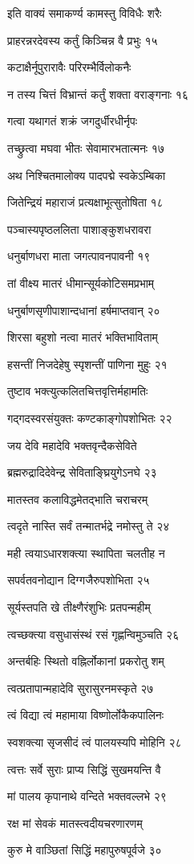 इति वाक्यं समाकर्ण्य कामस्तु विविधैः शरैः

प्राहरन्नरदेवस्य कर्तुं किञ्चिन्न वै प्रभुः १५

कटाक्षैर्नूपुरारावैः परिरम्भैर्विलोकनैः

न तस्य चित्तं विभ्रान्तं कर्तुं शक्ता वराङ्गनाः १६

गत्वा यथागतं शक्रं जगदुर्धीरधीर्नृपः

तच्छ्रुत्वा मघवा भीतः सेवामारभतात्मनः १७

अथ निश्चितमालोक्य पादपद्मे स्वकेऽम्बिका

जितेन्द्रियं महाराजं प्रत्यक्षाभूत्सुतोषिता १८

पञ्चास्यपृष्ठललिता पाशाङ्कुशधरावरा

धनुर्बाणधरा माता जगत्पावनपावनी १९

तां वीक्ष्य मातरं धीमान्सूर्यकोटिसमप्रभाम्

धनुर्बाणसृणीपाशान्दधानां हर्षमाप्तवान् २०

शिरसा बहुशो नत्वा मातरं भक्तिभाविताम्

हसन्तीं निजदेहेषु स्पृशन्तीं पाणिना मुहुः २१

तुष्टाव भक्त्युत्कलितचित्तवृत्तिर्महामतिः

गद्गदस्वरसंयुक्तः कण्टकाङ्गोपशोभितः २२

जय देवि महादेवि भक्तवृन्दैकसेविते

ब्रह्मरुद्रादिदेवेन्द्र सेविताङ्घ्रियुगेऽनघे २३

मातस्तव कलाविद्धमेतद्भाति चराचरम्

त्वदृते नास्ति सर्वं तन्मातर्भद्रे नमोस्तु ते २४

मही त्वयाऽधारशक्त्या स्थापिता चलतीह न

सपर्वतवनोद्यान दिग्गजैरुपशोभिता २५

सूर्यस्तपति खे तीक्ष्णैरंशुभिः प्रतपन्महीम्

त्वच्छक्त्या वसुधासंस्थं रसं गृह्णन्विमुञ्चति २६

अन्तर्बहिः स्थितो वह्निर्लोकानां प्रकरोतु शम्

त्वत्प्रतापान्महादेवि सुरासुरनमस्कृते २७

त्वं विद्या त्वं महामाया विष्णोर्लोकैकपालिनः

स्वशक्त्या सृजसीदं त्वं पालयस्यपि मोहिनि २८

त्वत्तः सर्वे सुराः प्राप्य सिद्धिं सुखमयन्ति वै

मां पालय कृपानाथे वन्दिते भक्तवल्लभे २९

रक्ष मां सेवकं मातस्त्वदीयचरणारणम्

कुरु मे वाञ्छितां सिद्धिं महापुरुषपूर्वजे ३०

